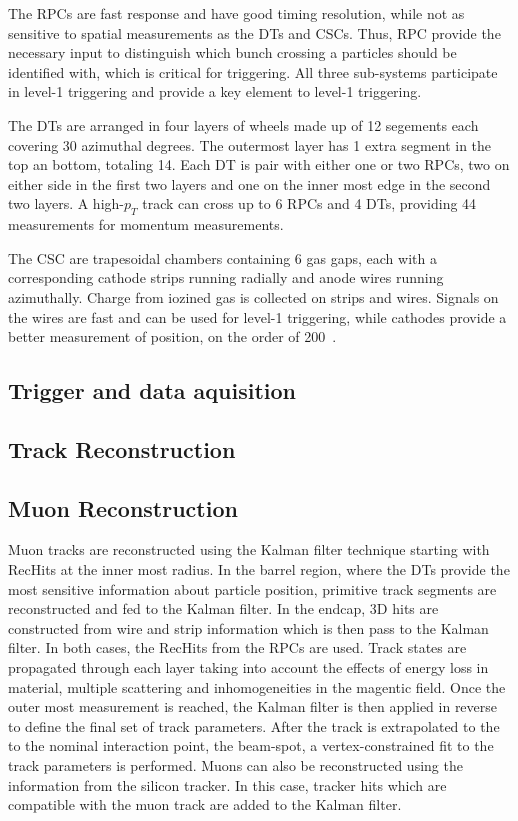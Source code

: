 The RPCs are fast response and have
good timing resolution, while not as sensitive to spatial measurements
as the DTs and CSCs.  Thus, RPC provide the necessary input to distinguish
which bunch crossing a particles should be identified with, which is critical
for triggering.  All three sub-systems participate in level-1 triggering
and provide a key element to level-1 triggering.

The DTs are arranged in four layers of wheels made up of 12 segements
each covering 30 azimuthal degrees.  The outermost layer has 1 extra 
segment in the top an bottom, totaling 14.  Each DT is pair with either
one or two RPCs, two on either side in the first two layers and one on
the inner most edge in the second two layers.  A high-$p_T$ track can 
cross up to 6 RPCs and 4 DTs, providing 44 measurements for momentum 
measurements. 

The CSC are trapesoidal chambers containing 6 gas gaps, each with a 
corresponding cathode strips running radially and anode wires running
azimuthally.  Charge from iozined gas is collected on strips and wires.
Signals on the wires are fast and can be used for level-1 triggering,
while cathodes provide a better measurement of position, on the order
of 200~\microns.

\subsection{Trigger and data aquisition}



\subsection{Track Reconstruction}
\label{sec:trackRECO}



\subsection{Muon Reconstruction}
\label{sec:muonRECO}


Muon tracks are reconstructed using the Kalman filter technique
starting with RecHits at the inner most radius.
In the barrel region, where the DTs provide the most sensitive 
information about particle position, primitive track segments
are reconstructed and fed to the Kalman filter.
In the endcap, 3D hits are constructed from wire and strip 
information which is then pass to the Kalman filter. In both
cases, the RecHits from the RPCs are used.  Track states are 
propagated through each layer taking into account the effects
of energy loss in material, multiple scattering and inhomogeneities
in the magentic field.  Once the outer most measurement is reached,
the Kalman filter is then applied in reverse to define the final
set of track parameters.  After the track is extrapolated to the 
to the nominal interaction point, the beam-spot, a vertex-constrained
fit to the track parameters is performed.
Muons can also be reconstructed using the information from the 
silicon tracker.  In this case, tracker hits which are compatible
with the muon track are added to the Kalman filter.

